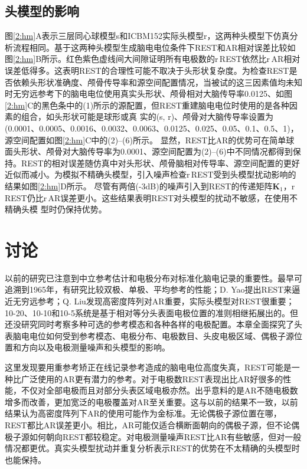 \subsection{头模型的影响}
\label{2:hm-disturb}
图\ref{2:hm}A表示三层同心球模型s和ICBM152实际头模型r，这两种头模型下仿真分析流程相同。基于这两种头模型生成脑电电位条件下REST和AR相对误差比较如图\ref{2:hm}B所示。红色紫色虚线间大间隙证明所有电极数的r\,REST依然比r\,AR相对误差低得多。这表明REST的合理性可能不取决于头形状复杂度。为检查REST是否依赖头形状准确度、颅骨传导率和源空间配置情况，当被试的这三因素值均未知时无穷远参考下的脑电电位使用真实头形状、颅骨相对大脑传导率0.0125、如图\ref{2:hm}C的黑色条中的(1)所示的源配置，但REST重建脑电电位时使用的是各种因素的组合，如头形状可能是球形或真
实的(s, r)、颅骨对大脑传导率设置为(0.0001、0.0005、0.0016、0.0032、0.0063、0.0125、0.025、0.05、0.1、0.5、1)，源空间配置如图\ref{2:hm}C中的(2)–(6)所示。 显然，REST比AR的优势可在简单球面头形状、颅骨对大脑传导率为0.0001、源空间配置为(2)–(6)中不同情况都得到保持。REST的相对误差随仿真中对头形状、颅骨脑相对传导率、源空间配置的更好近似而减小。为模拟不精确头模型，引入噪声检查r\,REST受到头模型扰动影响的结果如图\ref{2:hm}D所示。 尽管有两倍(-3dB)的噪声引入到REST的传递矩阵$\mathbf{K}_1$，r\,REST仍比r\,AR误差更小。这些结果表明REST对头模型的扰动不敏感，在使用不精确头模
型时仍保持优势。

\section{讨论}
以前的研究已注意到中立参考估计和电极分布对标准化脑电记录的重要性。最早可追溯到1965年，有研究比较双极、单极、平均参考的性能；D. Yao提出REST来逼近无穷远参考；Q. Liu发现高密度阵列对AR重要，实际头模型对REST很重要；10-20、10-10和10-5系统是基于相对等分头表面电极位置的准则相继拓展出的。但还没研究同时考察多种可选的参考模态和各种各样的电极配置。本章全面探究了头表脑电电位如何受到参考模态、电极分布、电极数目、头皮电极区域、偶极子源位置和方向以及电极测量噪声和头模型的影响。

这里发现要用重参考矫正在线记录参考造成的脑电电位高度失真，REST可能是一种比广泛使用的AR更有潜力的参考。对于电极数REST表现出比AR好很多的性能，不仅对全部电极而且对部分头表区域电极亦然。出乎意料的是AR不随电极数增多而改善，更加宽泛的电极覆盖对AR至关重要。这与以前的结果不一致，以前结果认为高密度阵列下AR的使用可能作为金标准。无论偶极子源位置在哪，REST都比AR误差更小。相比，AR可能仅适合横断面朝向的偶极子源，但不论偶极子源如何朝向REST都较稳定。对电极测量噪声REST比AR有些敏感，但对一般情况都更优。真实头模型扰动并重复分析表示REST的优势在不太精确的头模型时也能保持。

